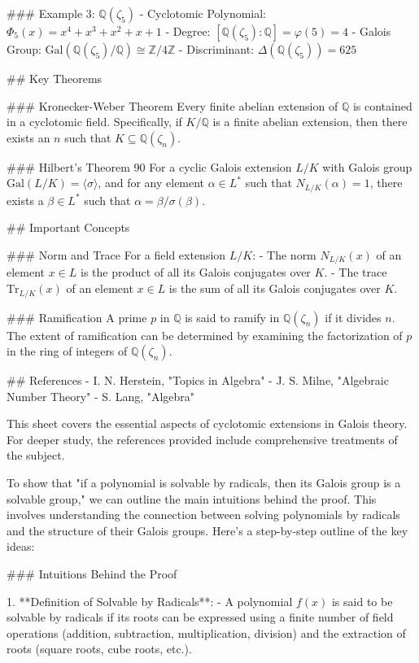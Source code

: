 ### Example 3: \(\mathbb{Q}(\zeta_5)\)
- Cyclotomic Polynomial: \(\Phi_5(x) = x^4 + x^3 + x^2 + x + 1\)
- Degree: \([\mathbb{Q}(\zeta_5) : \mathbb{Q}] = \varphi(5) = 4\)
- Galois Group: \(\text{Gal}(\mathbb{Q}(\zeta_5)/\mathbb{Q}) \cong \mathbb{Z}/4\mathbb{Z}\)
- Discriminant: \(\Delta(\mathbb{Q}(\zeta_5)) = 625\)

## Key Theorems

### Kronecker-Weber Theorem
Every finite abelian extension of \(\mathbb{Q}\) is contained in a cyclotomic field. Specifically, if \( K/\mathbb{Q} \) is a finite abelian extension, then there exists an \( n \) such that \( K \subseteq \mathbb{Q}(\zeta_n) \).

### Hilbert's Theorem 90
For a cyclic Galois extension \( L/K \) with Galois group \( \text{Gal}(L/K) = \langle \sigma \rangle \), and for any element \( \alpha \in L^* \) such that \( N_{L/K}(\alpha) = 1 \), there exists a \(\beta \in L^*\) such that \(\alpha = \beta / \sigma(\beta)\).

## Important Concepts

### Norm and Trace
For a field extension \( L/K \):
- The norm \( N_{L/K}(x) \) of an element \( x \in L \) is the product of all its Galois conjugates over \( K \).
- The trace \( \text{Tr}_{L/K}(x) \) of an element \( x \in L \) is the sum of all its Galois conjugates over \( K \).

### Ramification
A prime \( p \) in \(\mathbb{Q}\) is said to ramify in \(\mathbb{Q}(\zeta_n)\) if it divides \( n \). The extent of ramification can be determined by examining the factorization of \( p \) in the ring of integers of \(\mathbb{Q}(\zeta_n)\).

## References
- I. N. Herstein, "Topics in Algebra"
- J. S. Milne, "Algebraic Number Theory"
- S. Lang, "Algebra"

This sheet covers the essential aspects of cyclotomic extensions in Galois theory. For deeper study, the references provided include comprehensive treatments of the subject.


To show that "if a polynomial is solvable by radicals, then its Galois group is a solvable group," we can outline the main intuitions behind the proof. This involves understanding the connection between solving polynomials by radicals and the structure of their Galois groups. Here's a step-by-step outline of the key ideas:

### Intuitions Behind the Proof

1. **Definition of Solvable by Radicals**:
   - A polynomial \( f(x) \) is said to be solvable by radicals if its roots can be expressed using a finite number of field operations (addition, subtraction, multiplication, division) and the extraction of roots (square roots, cube roots, etc.).

